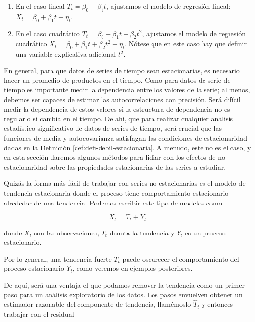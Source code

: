 \documentclass[12pt,]{krantz}
\theoremstyle{definition}
\theoremstyle{definition}
\theoremstyle{definition}
\theoremstyle{remark}
\begin{document}
\begin{enumerate}
\def\labelenumi{\arabic{enumi}.}
\item
  En el caso lineal \(T_t = \beta_0 + \beta_1t\), ajustamos el modelo de
  regresión lineal: \(X_t = \beta_0 + \beta_1t + \eta_t\).
\item
  En el caso cuadrático \(T_t = \beta_0 +\beta_1t+\beta_2t^2\),
  ajustamos el modelo de regresión cuadrático
  \(X_t = \beta_0+\beta_1t+\beta_2t^2 +\eta_t\). Nótese que en este caso
  hay que definir una variable explicativa adicional \(t^2\).
\end{enumerate}

En general, para que datos de series de tiempo sean estacionarias, es
necesario hacer un promedio de productos en el tiempo. Como para datos
de serie de tiempo es importante medir la dependencia entre los valores
de la serie; al menos, debemos ser capaces de estimar las
autocorrelaciones con precisión. Será difícil medir la dependencia de
estos valores si la estructura de dependencia no es regular o si cambia
en el tiempo. De ahí, que para realizar cualquier análisis estadístico
significativo de datos de series de tiempo, será crucial que las
funciones de media y autocovarianza satisfagan las condiciones de
estacionaridad dadas en la Definición \ref{def:defi-debil-estacionaria}.
A menudo, este no es el caso, y en esta sección daremos algunos métodos
para lidiar con los efectos de no-estacionaridad sobre las propiedades
estacionarias de las series a estudiar.

Quizás la forma más fácil de trabajar con series no-estacionarias es el
modelo de tendencia estacionaria donde el proceso tiene comportamiento
estacionario alrededor de una tendencia. Podemos escribir este tipo de
modelos como

\begin{equation}
X_t=T_t+Y_t
\label{eq:eq-modelo-tendencia-estacionaria}
\end{equation}

donde \(X_t\) son las observaciones, \(T_t\) denota la tendencia y
\(Y_t\) es un proceso estacionario.

Por lo general, una tendencia fuerte \(T_t\) puede oscurecer el
comportamiento del proceso estacionario \(Y_t\), como veremos en
ejemplos posteriores.

De aquí, será una ventaja el que podamos remover la tendencia como un
primer paso para un análisis exploratorio de los datos. Los pasos
envuelven obtener un estimador razonable del componente de tendencia,
llamémoslo \(\hat{T}_t\) y entonces trabajar con el residual
\end{document}
